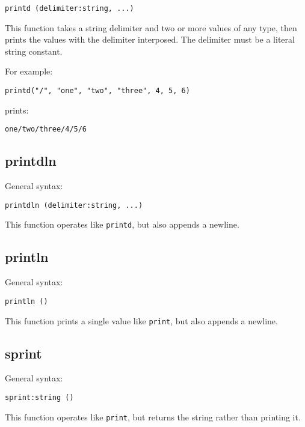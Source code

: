 \documentclass[twoside,english]{article}
\newenvironment{vindent}
{\begin{list}{}{\setlength{\listparindent}{6pt}}
\item[]}
{\end{list}}
\begin{document}
\begin{vindent}
\begin{verbatim}
printd (delimiter:string, ...)
\end{verbatim}
\end{vindent}
This function takes a string delimiter and two or more values of any type, then
prints the values with the delimiter interposed. The delimiter must be a
literal string constant.

For example:
\begin{vindent}
\begin{verbatim}
printd("/", "one", "two", "three", 4, 5, 6)
\end{verbatim}
\end{vindent}
prints:
\begin{vindent}
\begin{verbatim}
one/two/three/4/5/6
\end{verbatim}
\end{vindent}

\subsection{printdln}
General syntax:

\begin{vindent}
\begin{verbatim}
printdln (delimiter:string, ...)
\end{verbatim}
\end{vindent}
This function operates like \texttt{printd}, but also appends a newline.

\subsection{println}
General syntax:

\begin{vindent}
\begin{verbatim}
println ()
\end{verbatim}
\end{vindent}
This function prints a single value like \texttt{print},
but also appends a newline.

\subsection{sprint}
General syntax:

\begin{vindent}
\begin{verbatim}
sprint:string ()
\end{verbatim}
\end{vindent}
This function operates like \texttt{print}, but returns the string rather
than printing it.
\end{document}
